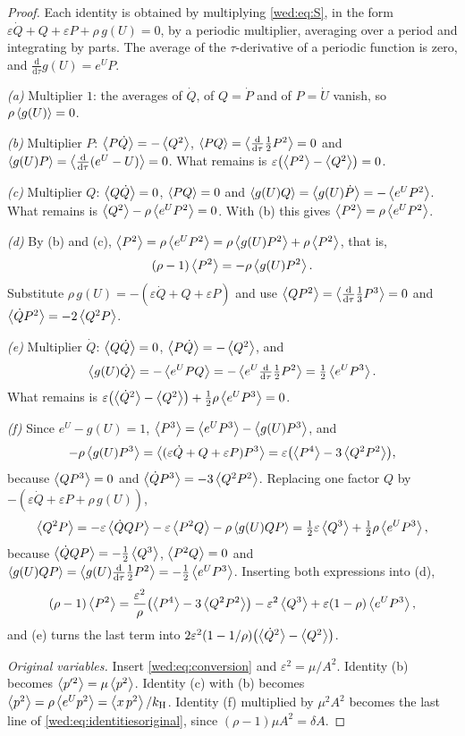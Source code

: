 \begin{proof}
Each identity is obtained by multiplying \eqref{wed:eq:S}, in the form $\varepsilon\dot Q+Q+\varepsilon P+\rho\,g(U)=0$, by a periodic multiplier, averaging over a period and integrating by parts. The average of the $\tau$-derivative of a periodic function is zero, and $\tfrac{\mathrm d}{\mathrm d\tau}g(U)=e^UP$.

\emph{(a)} Multiplier $1$: the averages of $\dot Q$, of $Q=\dot P$ and of $P=\dot U$ vanish, so $\rho\avg{g(U)}=0$.

\emph{(b)} Multiplier $P$: $\avg{P\dot Q}=-\avg{Q^2}$, $\avg{PQ}=\avg{\tfrac{\mathrm d}{\mathrm d\tau}\tfrac12P^2}=0$ and $\avg{g(U)P}=\avg{\tfrac{\mathrm d}{\mathrm d\tau}(e^U-U)}=0$. What remains is $\varepsilon\bigl(\avg{P^2}-\avg{Q^2}\bigr)=0$.

\emph{(c)} Multiplier $Q$: $\avg{Q\dot Q}=0$, $\avg{PQ}=0$ and $\avg{g(U)Q}=\avg{g(U)\dot P}=-\avg{e^UP^2}$. What remains is $\avg{Q^2}-\rho\avg{e^UP^2}=0$. With (b) this gives $\avg{P^2}=\rho\avg{e^UP^2}$.

\emph{(d)} By (b) and (c), $\avg{P^2}=\rho\avg{e^UP^2}=\rho\avg{g(U)P^2}+\rho\avg{P^2}$, that is,
\[
(\rho-1)\avg{P^2}=-\rho\avg{g(U)P^2}.
\]
Substitute $\rho\,g(U)=-(\varepsilon\dot Q+Q+\varepsilon P)$ and use $\avg{QP^2}=\avg{\tfrac{\mathrm d}{\mathrm d\tau}\tfrac13P^3}=0$ and $\avg{\dot QP^2}=-2\avg{Q^2P}$.

\emph{(e)} Multiplier $\dot Q$: $\avg{Q\dot Q}=0$, $\avg{P\dot Q}=-\avg{Q^2}$, and
\[
\avg{g(U)\dot Q}=-\avg{e^UPQ}=-\avg{e^U\tfrac{\mathrm d}{\mathrm d\tau}\tfrac12P^2}=\tfrac12\avg{e^UP^3}.
\]
What remains is $\varepsilon\bigl(\avg{\dot Q^2}-\avg{Q^2}\bigr)+\tfrac12\rho\avg{e^UP^3}=0$.

\emph{(f)} Since $e^U-g(U)=1$, $\avg{P^3}=\avg{e^UP^3}-\avg{g(U)P^3}$, and
\[
-\rho\avg{g(U)P^3}=\avg{(\varepsilon\dot Q+Q+\varepsilon P)P^3}=\varepsilon\bigl(\avg{P^4}-3\avg{Q^2P^2}\bigr),
\]
because $\avg{QP^3}=0$ and $\avg{\dot QP^3}=-3\avg{Q^2P^2}$. Replacing one factor $Q$ by $-(\varepsilon\dot Q+\varepsilon P+\rho\,g(U))$,
\[
\avg{Q^2P}=-\varepsilon\avg{\dot QQP}-\varepsilon\avg{P^2Q}-\rho\avg{g(U)QP}
=\tfrac12\varepsilon\avg{Q^3}+\tfrac12\rho\avg{e^UP^3},
\]
because $\avg{\dot QQP}=-\tfrac12\avg{Q^3}$, $\avg{P^2Q}=0$ and $\avg{g(U)QP}=\avg{g(U)\tfrac{\mathrm d}{\mathrm d\tau}\tfrac12P^2}=-\tfrac12\avg{e^UP^3}$. Inserting both expressions into (d),
\[
(\rho-1)\avg{P^2}=\frac{\varepsilon^2}{\rho}\bigl(\avg{P^4}-3\avg{Q^2P^2}\bigr)-\varepsilon^2\avg{Q^3}+\varepsilon(1-\rho)\avg{e^UP^3},
\]
and (e) turns the last term into $2\varepsilon^2(1-1/\rho)\bigl(\avg{\dot Q^2}-\avg{Q^2}\bigr)$.

\emph{Original variables.} Insert \eqref{wed:eq:conversion} and $\varepsilon^2=\mu/A^2$. Identity (b) becomes $\avg{p'^2}=\mu\avg{p^2}$. Identity (c) with (b) becomes $\avg{p^2}=\rho\avg{e^Up^2}=\avg{x\,p^2}/\kH$. Identity (f) multiplied by $\mu^2A^2$ becomes the last line of \eqref{wed:eq:identitiesoriginal}, since $(\rho-1)\mu A^2=\delta A$.
\end{proof}
